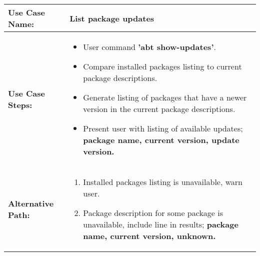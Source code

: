 \medskip

\begin{tabularx}{\linewidth}{|l|X|}
\hline
\textbf{Use Case Name:} & \textbf{List package updates} \\
\hline
\textbf{Use Case Steps:} & 
\begin{minipage}{\linewidth} 
  \vspace{0.05em}
  \begin{itemize}
    \item User command \textbf{'abt show-updates'}.
    \item Compare installed packages listing to current package descriptions.
    \item Generate listing of packages that have a newer version in the current package descriptions.
    \item Present user with listing of available updates; \textbf{package name, current version, update version.}
  \end{itemize}
  \vspace{0.05em}
\end{minipage}
\\
\hline 
\textbf{Alternative Path:} &
\begin{minipage}{\linewidth}
  \vspace{0.05em} 
  \begin{enumerate}
    \item Installed packages listing is unavailable, warn user.
    \item Package description for some package is unavailable, include line in results; \textbf{package name, current version, unknown.}
  \end{enumerate}
  \vspace{0.05em} 
\end{minipage}
\\
\hline
\end{tabularx}